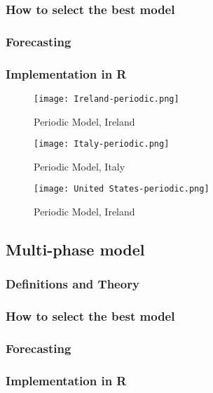 \subsubsection{How to select the best model}

\subsubsection{Forecasting}

\subsubsection{Implementation in R}

\begin{figure}[H]
  \texttt{[image: Ireland-periodic.png]} \label{fig:usa-periodic}
\endminipage
\caption{Periodic Model, Ireland}
\end{figure}

\begin{figure}[H]
  \texttt{[image: Italy-periodic.png]} \label{fig:italy-periodic}
\endminipage 
\caption{Periodic Model, Italy}
\end{figure}

\begin{figure}[H]
  \texttt{[image: United States-periodic.png]} \label{fig:usa-periodic}
\endminipage
\caption{Periodic Model, Ireland}
\end{figure}

\subsection{Multi-phase model}

\subsubsection{Definitions and Theory}

\subsubsection{How to select the best model}

\subsubsection{Forecasting}

\subsubsection{Implementation in R}

